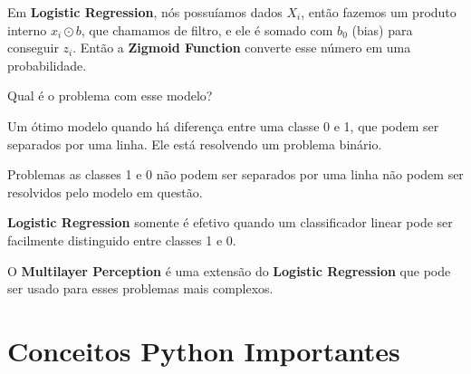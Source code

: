 \documentclass[11pt, a4paper]{article}
\begin{document}
Em \textbf{Logistic Regression}, nós possuíamos dados $X_i$, então fazemos um produto interno $x_i \odot b$, que chamamos de filtro, e ele é somado com $b_0$ (bias) para conseguir $z_i$. Então a \textbf{Zigmoid Function} converte esse número em uma probabilidade.

Qual é o problema com esse modelo?

Um ótimo modelo quando há diferença entre uma classe 0 e 1, que podem ser separados por uma linha. Ele está resolvendo um problema binário.

Problemas as classes 1 e 0 não podem ser separados por uma linha não podem ser resolvidos pelo modelo em questão.


\textbf{Logistic Regression} somente é efetivo quando um classificador linear pode ser facilmente distinguido entre classes 1 e 0.


O \textbf{Multilayer Perception} é uma extensão do \textbf{Logistic Regression} que pode ser usado para esses problemas mais complexos.

\pagebreak

\section{Conceitos Python Importantes}
\end{document}
